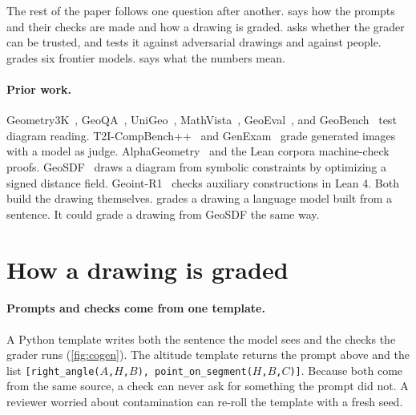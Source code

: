\documentclass{article}
\begin{document}
The rest of the paper follows one question after another.
 says how the prompts and their checks are made and how a drawing is graded.
 asks whether the grader can be trusted, and tests it against adversarial drawings and against people.
 grades six frontier models.
 says what the numbers mean.

\paragraph{Prior work.}
Geometry3K~\citep{lu2021intergps}, GeoQA~\citep{chen2021geoqa}, UniGeo~\citep{chen2022unigeo}, MathVista~\citep{lu2024mathvista}, GeoEval~\citep{zhang2024geoeval}, and GeoBench~\citep{geobench2026} test diagram reading.
T2I-CompBench++~\citep{huang2025t2icompbenchpp} and GenExam~\citep{wang2025genexam} grade generated images with a model as judge.
AlphaGeometry~\citep{trinh2024alphageometry} and the Lean corpora machine-check proofs.
GeoSDF~\citep{zhang2025geosdf} draws a diagram from symbolic constraints by optimizing a signed distance field.
Geoint-R1~\citep{wei2025geointr1} checks auxiliary constructions in Lean 4.
Both build the drawing themselves.
\GeoGenBench grades a drawing a language model built from a sentence.
It could grade a drawing from GeoSDF the same way.

\section{How a drawing is graded}
\label{sec:design}

\paragraph{Prompts and checks come from one template.}
A Python template writes both the sentence the model sees and the checks the grader runs (\cref{fig:cogen}).
The altitude template returns the prompt above and the list \texttt{[right\_angle($A$,$H$,$B$), point\_on\_segment($H$,$B$,$C$)]}.
Because both come from the same source, a check can never ask for something the prompt did not.
A reviewer worried about contamination can re-roll the template with a fresh seed.
\end{document}
